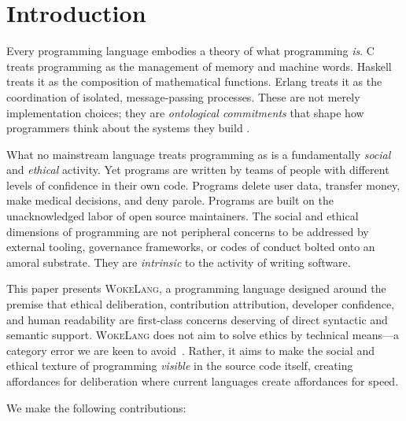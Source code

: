 \documentclass[11pt,a4paper]{article}
\newcommand{\WokeLang}{\textsc{WokeLang}}
\begin{document}
\section{Introduction}
\label{sec:introduction}

Every programming language embodies a theory of what programming
\emph{is}.  C treats programming as the management of memory and
machine words.  Haskell treats it as the composition of mathematical
functions.  Erlang treats it as the coordination of isolated,
message-passing processes.  These are not merely implementation
choices; they are \emph{ontological commitments} that shape how
programmers think about the systems they build
\citep{sapir1929status,whorf1956language,iverson1980notation}.

What no mainstream language treats programming as is a fundamentally
\emph{social} and \emph{ethical} activity.  Yet programs are written by
teams of people with different levels of confidence in their own code.
Programs delete user data, transfer money, make medical decisions, and
deny parole.  Programs are built on the unacknowledged labor of open
source maintainers.  The social and ethical dimensions of programming
are not peripheral concerns to be addressed by external tooling,
governance frameworks, or codes of conduct bolted onto an amoral
substrate.  They are \emph{intrinsic} to the activity of writing
software.

This paper presents \WokeLang{}, a programming language designed
around the premise that ethical deliberation, contribution
attribution, developer confidence, and human readability are
first-class concerns deserving of direct syntactic and semantic
support.  \WokeLang{} does not aim to solve ethics by technical
means---a category error we are keen to
avoid~\citep{green2019good,selbst2019fairness}.  Rather, it aims to
make the social and ethical texture of programming \emph{visible} in
the source code itself, creating affordances for deliberation where
current languages create affordances for speed.

We make the following contributions:
\end{document}

